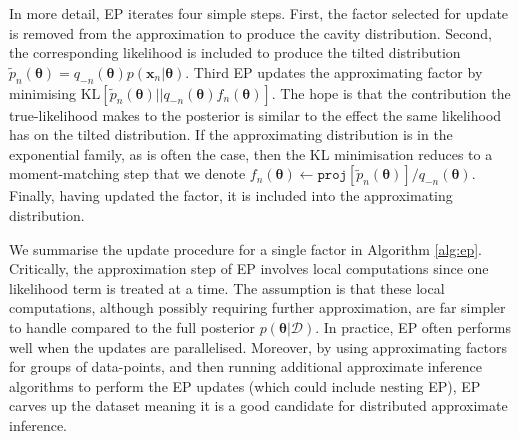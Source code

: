 In more detail, EP iterates four simple steps. First, the factor selected for update is removed from the approximation to produce the cavity distribution. Second, the corresponding likelihood is included to produce the tilted distribution $\tilde{p}_n(\bm{\theta}) = q_{-n}(\bm{\theta}) p(\bm{x}_n | \bm{\theta})$. Third EP updates the approximating factor by minimising $\mathrm{KL}[\tilde{p}_n(\bm{\theta}) || q_{-n}(\bm{\theta})  f_n(\bm{\theta})]$. The hope is that the contribution the true-likelihood makes to the posterior is similar to the effect the same likelihood has on the tilted distribution. If the approximating distribution is in the exponential family, as is often the case, then the KL minimisation reduces to a moment-matching step \cite{amari:ig} that we denote $f_n(\bm{\theta}) \leftarrow \mathtt{proj}[\tilde{p}_n(\bm{\theta})] / q_{-n}(\bm{\theta}) $. Finally, having updated the factor, it is included into the approximating distribution.
%
%
%
%
%

We summarise the update procedure for a single factor in Algorithm \ref{alg:ep}. Critically, the approximation step of EP involves local computations since one likelihood term is treated at a time. The assumption is that these local computations, although possibly requiring further approximation, are far simpler to handle compared to the full posterior $p(\bm{\theta}| \mathcal{D})$. In practice, EP often performs well when the updates are parallelised. Moreover, by using approximating factors for groups of data-points, and then running additional approximate inference algorithms to perform the EP updates (which could include nesting EP), EP carves up the dataset meaning it is a good candidate for distributed approximate inference.

